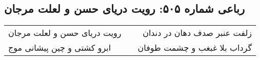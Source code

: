 \begin{center}
\section*{رباعی شماره ۵۰۵: رویت دریای حسن و لعلت مرجان}
\label{sec:sh505}
\begin{longtable}{l p{0.5cm} r}
رویت دریای حسن و لعلت مرجان
&&
زلفت عنبر صدف دهان در دندان
\\
ابرو کشتی و چین پیشانی موج
&&
گرداب بلا غبغب و چشمت طوفان
\\
\end{longtable}
\end{center}
